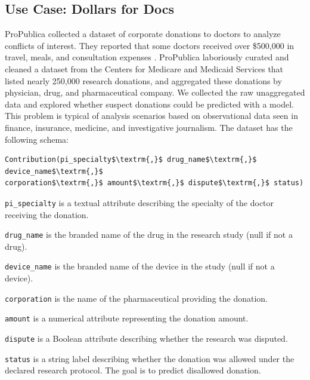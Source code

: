 \subsection{Use Case: Dollars for Docs \cite{dollarsfordocs}}
ProPublica collected a dataset of corporate donations to doctors to analyze conflicts of interest. 
They reported that some doctors received over \$500,000 in travel, meals, and consultation expenses \cite{dollarsfordocsa}.
ProPublica laboriously curated and cleaned a dataset from the Centers for Medicare and Medicaid Services that listed nearly 250,000 research donations, and aggregated these donations by physician, drug, and pharmaceutical company.
We collected the raw unaggregated data and explored whether suspect donations could be predicted with a model.
This problem is typical of analysis scenarios based on observational data seen in finance, insurance, medicine, and investigative journalism.
The dataset has the following schema:
\begin{lstlisting}[mathescape,basicstyle={\scriptsize}]
Contribution(pi_specialty$\textrm{,}$ drug_name$\textrm{,}$ device_name$\textrm{,}$
corporation$\textrm{,}$ amount$\textrm{,}$ dispute$\textrm{,}$ status)
\end{lstlisting}

\noindent\texttt{pi\_specialty} is a textual attribute describing the specialty of the doctor receiving the donation.

\noindent\texttt{drug\_name} is the branded name of the drug in the research study (null if not a drug).

\noindent\texttt{device\_name} is the branded name of the device in the study (null if not a device).

\noindent\texttt{corporation} is the name of the pharmaceutical providing the donation.

\noindent\texttt{amount} is a numerical attribute representing the donation amount.

\noindent\texttt{dispute} is a Boolean attribute describing whether the research was disputed.

\noindent\texttt{status} is a string label describing whether the  donation was allowed under the declared research protocol. The goal is to predict disallowed  donation. 

\vspace{0.5em}

